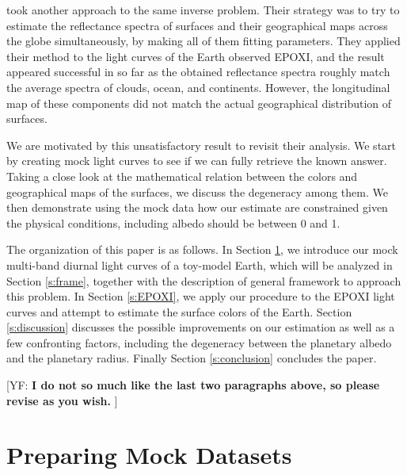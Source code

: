 \documentclass[iop,numberedappendix,apj]{emulateapj}
\def\memoYF#1{\color{red}[YF: {\bf #1}]\color{black}}
\begin{document}
\citet{Cowan2013} took another approach to the same inverse problem. 
Their strategy was to try to estimate the reflectance spectra of surfaces and their geographical maps across the globe simultaneously, by making all of them fitting parameters. 
They applied their method to the light curves of the Earth observed EPOXI, and the result appeared successful in so far as the obtained reflectance spectra roughly match the average spectra of clouds, ocean, and continents. 
However, the longitudinal map of these components did not match the actual geographical distribution of surfaces. 

We are motivated by this unsatisfactory result to revisit their analysis. 
We start by creating mock light curves to see if we can fully retrieve the known answer. 
Taking a close look at the mathematical relation between the colors and geographical maps of the surfaces, we discuss the degeneracy among them. 
We then demonstrate using the mock data how our estimate are constrained given the physical conditions, including albedo should be between 0 and 1. 

The organization of this paper is as follows. 
In Section \ref{s:mockdata}, we introduce our mock multi-band diurnal light curves of a toy-model Earth, which will be analyzed in Section \ref{s:frame}, together with the description of general framework to approach this problem. 
In Section \ref{s:EPOXI}, we apply our procedure to the EPOXI light curves and attempt to estimate the surface colors of the Earth. 
Section \ref{s:discussion} discusses the possible improvements on our estimation as well as a few confronting factors, including the degeneracy between the planetary albedo and the planetary radius. 
Finally Section \ref{s:conclusion} concludes the paper. 

\memoYF{I do not so much like the last two paragraphs above, so please revise as you wish. }





\section{Preparing Mock Datasets}
\label{s:mockdata}
\end{document}

